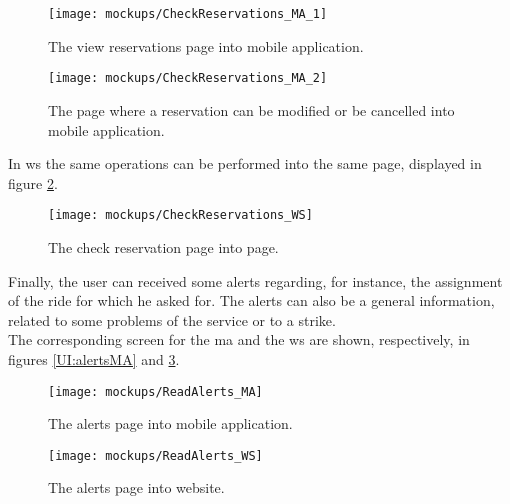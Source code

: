 \documentclass[\mainpath/main]{subfiles}
\begin{document}
\clearpage

\begin{figure}[ht!]
	\centering
	\begin{minipage}[t]{0.4\textwidth}
		\centering
		\texttt{[image: mockups/CheckReservations\_MA\_1]}
		\caption[View reservation into mobile application.]{The view reservations page into mobile application.}
		\label{UI:reservationMA1}
	\end{minipage}
	\hspace{1 cm}
	\begin{minipage}[t]{0.40\linewidth}
		\centering
		\texttt{[image: mockups/CheckReservations\_MA\_2]}
		\caption[Modify reservations into mobile application.]{The page where a reservation can be modified or be cancelled into mobile application.}
		\label{UI:reservationMA2}
	\end{minipage}
\end{figure}

In \gls{ws} the same operations can be performed into the same page, displayed in figure \ref{UI:reservationWS}.

\begin{figure}[ht!]
	\centering
	\texttt{[image: mockups/CheckReservations\_WS]}
	\caption[Check reservation into website.]{The check reservation page into page.}
	\label{UI:reservationWS}
\end{figure}

\clearpage

Finally, the user can received some alerts regarding, for instance, the assignment of the ride for which he asked for. The alerts can also be a general information, related to some problems of the service or to a strike.\\
The corresponding screen for the \gls{ma} and the \gls{ws} are shown, respectively, in figures \ref{UI:alertsMA} and \ref{UI:alertsWS}.

\begin{figure}[ht!]
	\centering
	\begin{minipage}[t]{0.4\textwidth}
		\centering
		\texttt{[image: mockups/ReadAlerts\_MA]}
		\caption[Read the alerts into mobile application.]{The alerts page into mobile application.}
		\label{UI:alertsMA}
	\end{minipage}
	\hspace{0.5 cm}
	\begin{minipage}[t]{0.40\linewidth}
		\centering
		\texttt{[image: mockups/ReadAlerts\_WS]}
		\caption[Read the alerts into website.]{The alerts page into website.}
		\label{UI:alertsWS}
	\end{minipage}
\end{figure}

\end{document}
